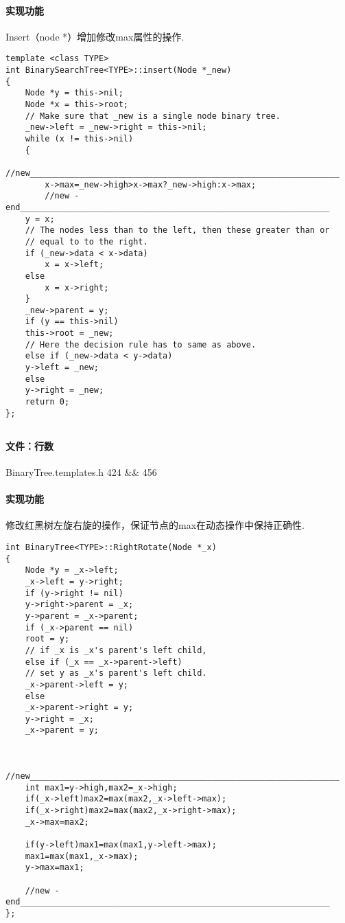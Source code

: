 \documentclass{article}
\begin{document}
\paragraph{实现功能}
Insert（node *）增加修改max属性的操作.
\begin{lstlisting}
template <class TYPE>
int BinarySearchTree<TYPE>::insert(Node *_new)
{
    Node *y = this->nil;
    Node *x = this->root;
    // Make sure that _new is a single node binary tree.
    _new->left = _new->right = this->nil;
    while (x != this->nil)
    {
        //new_______________________________________________________________
        x->max=_new->high>x->max?_new->high:x->max;
        //new -end_______________________________________________________________
	y = x;
	// The nodes less than to the left, then these greater than or
	// equal to to the right.
	if (_new->data < x->data)
	    x = x->left;
	else
	    x = x->right;
    }
    _new->parent = y;
    if (y == this->nil)
	this->root = _new;
    // Here the decision rule has to same as above.
    else if (_new->data < y->data)
	y->left = _new;
    else
	y->right = _new;
    return 0;
};
\end{lstlisting}

\subsection{}
\paragraph{文件：行数}
BinaryTree.templates.h 			424 \&\& 456
\paragraph{实现功能}
修改红黑树左旋右旋的操作，保证节点的max在动态操作中保持正确性.
\begin{lstlisting}
int BinaryTree<TYPE>::RightRotate(Node *_x)
{
    Node *y = _x->left;
    _x->left = y->right;
    if (y->right != nil)
	y->right->parent = _x;
    y->parent = _x->parent;
    if (_x->parent == nil)
	root = y;
    // if _x is _x's parent's left child,
    else if (_x == _x->parent->left)
	// set y as _x's parent's left child.
	_x->parent->left = y;
    else
	_x->parent->right = y;
    y->right = _x;
    _x->parent = y;
    
    
    //new_______________________________________________________________
    int max1=y->high,max2=_x->high;
    if(_x->left)max2=max(max2,_x->left->max);
    if(_x->right)max2=max(max2,_x->right->max);
    _x->max=max2;
    
    if(y->left)max1=max(max1,y->left->max);
    max1=max(max1,_x->max);
    y->max=max1;
    
    //new -end_______________________________________________________________
};
\end{lstlisting}
\end{document}
